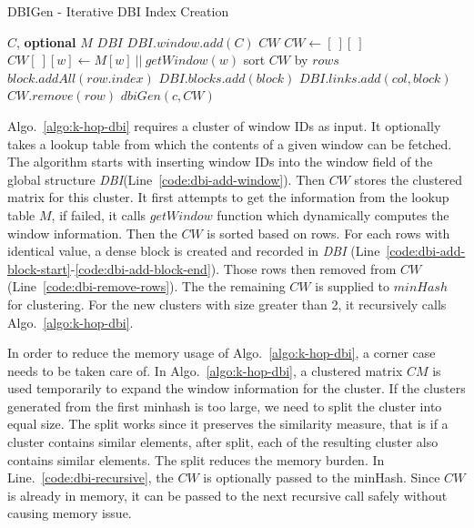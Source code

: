 {\begin{algorithm}
\caption{DBIGen - Iterative DBI Index Creation }
\begin{algorithmic}[1]
\REQUIRE $C$, \textbf{optional} $M$ 
\GLOBAL $DBI$ 
\STATE $DBI.window.add(C)$  \label{code:dbi-add-window}
\STATE $CW$ 
	\STATE $CW \leftarrow [\ ][\ ]$ \label{code:dbi-window-partition-start}
		\STATE $CW[\ ][w] \leftarrow M[w]\ ||\ getWindow(w)$
	\ENDFOR \label{code:dbi-window-partition-end}
	\STATE sort $CW$ by $rows$ \label{code:dbi-sort}
		\STATE $block.addAll(row.index)$ \label{code:dbi-add-block-start} 
		\STATE $DBI.blocks.add(block)$
			\STATE $DBI.links.add(col, block)$		
		\ENDFOR \label{code:dbi-add-block-end}
		\STATE $CW.remove(row)$ \label{code:dbi-remove-rows}
	\ENDFOR
	 \label{code:dbi-remain-min}
			\STATE $dbiGen(c, CW)$ \label{code:dbi-recursive}
		\ENDIF
	\ENDFOR
\end{algorithmic}
\label{algo:k-hop-dbi}
\end{algorithm}

Algo.~\ref{algo:k-hop-dbi} requires a cluster of window IDs as input. It optionally takes a lookup table from which the contents of a given window can be fetched. The algorithm starts with inserting window IDs into the window field of the global structure \emph{DBI}(Line~\ref{code:dbi-add-window}). Then $CW$ stores the clustered matrix for this cluster. It first attempts to get the information from the lookup table $M$, if failed, it calls $getWindow$ function which dynamically computes the window information. Then the $CW$ is sorted based on rows. For each rows with identical value, a dense block is created and recorded in \emph{DBI} (Line~\ref{code:dbi-add-block-start}-\ref{code:dbi-add-block-end}). Those rows then removed from $CW$ (Line~\ref{code:dbi-remove-rows}). The the remaining $CW$ is supplied to $minHash$ for clustering. For the new clusters with size greater than 2, it recursively calls Algo.~\ref{algo:k-hop-dbi}.

In order to reduce the memory usage of Algo.~\ref{algo:k-hop-dbi}, a corner case needs to be taken care of. In Algo.~\ref{algo:k-hop-dbi}, a clustered matrix $CM$ is used temporarily to expand the window information for the cluster. If the clusters generated from the first minhash is too large, we need to split the cluster into equal size. The split works since it preserves the similarity measure, that is if a cluster contains similar elements, after split, each of the resulting cluster also contains similar elements. The split reduces the memory burden. In Line.~\ref{code:dbi-recursive}, the $CW$ is optionally passed to the minHash. Since $CW$ is already in memory, it can be passed to the next recursive call safely without causing memory issue.
 
}
